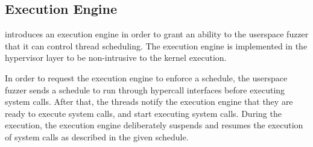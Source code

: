


\subsection{Execution Engine}
\label{ss:engine}

\sys introduces an execution engine in order to grant an ability to
the userspace fuzzer that it can control thread scheduling.
%
The execution engine is implemented in the hypervisor layer to be
non-intrusive to the kernel execution.




%


%
In order to request the execution engine to enforce a schedule, the
userspace fuzzer sends a schedule to run through hypercall interfaces
before executing system calls.
%
After that, the threads notify the execution engine that they are
ready to execute system calls, and start executing system calls.
%
During the execution, the execution engine deliberately suspends and
resumes the execution of system calls as described in the given
schedule.


